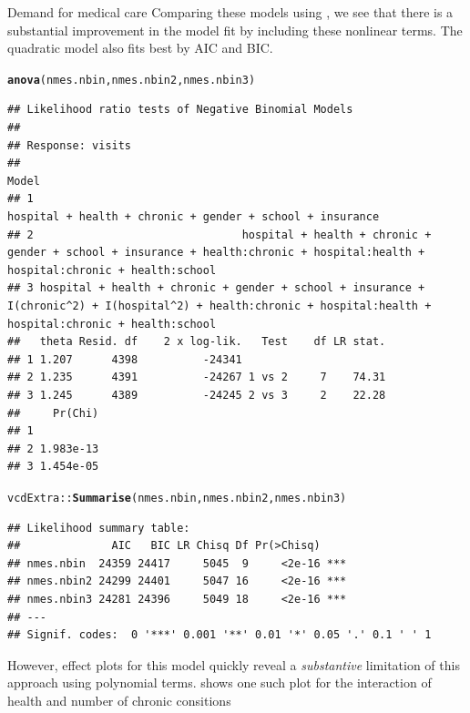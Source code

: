\documentclass[11pt]{book}\usepackage[]{graphicx}\usepackage[]{color}
\makeatletter
\newcommand{\hlstd}[1]{\textcolor[rgb]{0.345,0.345,0.345}{#1}}%
\newcommand{\hlkwd}[1]{\textcolor[rgb]{0.737,0.353,0.396}{\textbf{#1}}}%
\newenvironment{kframe}{%
 \def\at@end@of@kframe{}%
 \ifinner\ifhmode%
  \def\at@end@of@kframe{\end{minipage}}%
  \begin{minipage}{\columnwidth}%
 \fi\fi%
 \def\FrameCommand##1{\hskip\@totalleftmargin \hskip-\fboxsep
 \colorbox{shadecolor}{##1}\hskip-\fboxsep
     \hskip-\linewidth \hskip-\@totalleftmargin \hskip\columnwidth}%
 \MakeFramed {\advance\hsize-\width
   \@totalleftmargin\z@ \linewidth\hsize
   \@setminipage}}%
 {\par\unskip\endMakeFramed%
 \at@end@of@kframe}
\newenvironment{knitrout}{}{} %
\renewenvironment{knitrout}{\small\renewcommand{\baselinestretch}{.85}}{} %
\makeatother
\begin{document}
\begin{Example}[nmes3]{Demand for medical care}
\begin{knitrout}
\end{knitrout}
Comparing these models using , we see that there is a substantial improvement in the
model fit by including these nonlinear terms.  The quadratic model also fits best by AIC and BIC.
\begin{knitrout}
\color{fgcolor}\begin{kframe}
\begin{alltt}
\hlkwd{anova}\hlstd{(nmes.nbin, nmes.nbin2, nmes.nbin3)}
\end{alltt}
\begin{verbatim}
## Likelihood ratio tests of Negative Binomial Models
## 
## Response: visits
##                                                                                                                                                            Model
## 1                                                                                                      hospital + health + chronic + gender + school + insurance
## 2                                hospital + health + chronic + gender + school + insurance + health:chronic + hospital:health + hospital:chronic + health:school
## 3 hospital + health + chronic + gender + school + insurance + I(chronic^2) + I(hospital^2) + health:chronic + hospital:health + hospital:chronic + health:school
##   theta Resid. df    2 x log-lik.   Test    df LR stat.
## 1 1.207      4398          -24341                      
## 2 1.235      4391          -24267 1 vs 2     7    74.31
## 3 1.245      4389          -24245 2 vs 3     2    22.28
##     Pr(Chi)
## 1          
## 2 1.983e-13
## 3 1.454e-05
\end{verbatim}
\begin{alltt}
\hlstd{vcdExtra::}\hlkwd{Summarise}\hlstd{(nmes.nbin, nmes.nbin2, nmes.nbin3)}
\end{alltt}
\begin{verbatim}
## Likelihood summary table:
##              AIC   BIC LR Chisq Df Pr(>Chisq)    
## nmes.nbin  24359 24417     5045  9     <2e-16 ***
## nmes.nbin2 24299 24401     5047 16     <2e-16 ***
## nmes.nbin3 24281 24396     5049 18     <2e-16 ***
## ---
## Signif. codes:  0 '***' 0.001 '**' 0.01 '*' 0.05 '.' 0.1 ' ' 1
\end{verbatim}
\end{kframe}
\end{knitrout}
However, effect plots for this model quickly reveal a \emph{substantive} limitation of this approach using polynomial terms.
 shows one such plot for the interaction of health and number of chronic consitions

\end{Example}
\end{document}
